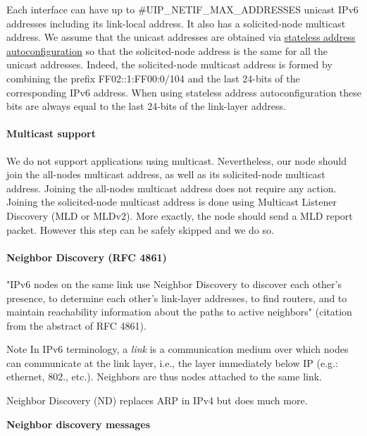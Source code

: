 \-Each interface can have up to \#\-U\-I\-P\-\_\-\-N\-E\-T\-I\-F\-\_\-\-M\-A\-X\-\_\-\-A\-D\-D\-R\-E\-S\-S\-E\-S unicast \-I\-Pv6 addresses including its link-\/local address. \-It also has a solicited-\/node multicast address. \-We assume that the unicast addresses are obtained via \hyperlink{a00061_autoconf}{stateless address autoconfiguration} so that the solicited-\/node address is the same for all the unicast addresses. \-Indeed, the solicited-\/node multicast address is formed by combining the prefix \-F\-F02\-:\-:1\-:\-F\-F00\-:0/104 and the last 24-\/bits of the corresponding \-I\-Pv6 address. \-When using stateless address autoconfiguration these bits are always equal to the last 24-\/bits of the link-\/layer address.\hypertarget{a00061_multicast}{}\paragraph{\-Multicast support}\label{a00061_multicast}
\-We do not support applications using multicast. \-Nevertheless, our node should join the all-\/nodes multicast address, as well as its solicited-\/node multicast address. \-Joining the all-\/nodes multicast address does not require any action. \-Joining the solicited-\/node multicast address is done using \-Multicast \-Listener \-Discovery (\-M\-L\-D or \-M\-L\-Dv2). \-More exactly, the node should send a \-M\-L\-D report packet. \-However this step can be safely skipped and we do so.\hypertarget{a00061_nd}{}\paragraph{\-Neighbor Discovery (\-R\-F\-C 4861)}\label{a00061_nd}
"\-I\-Pv6 nodes on the same link use \-Neighbor \-Discovery to discover each other's presence, to determine each other's link-\/layer addresses, to find routers, and to maintain reachability information about the paths to active neighbors" (citation from the abstract of \-R\-F\-C 4861).

\begin{DoxyNote}{\-Note}
\-In \-I\-Pv6 terminology, a {\itshape link\/} is a communication medium over which nodes can communicate at the link layer, i.\-e., the layer immediately below \-I\-P (e.\-g.\-: ethernet, 802., etc.). \-Neighbors are thus nodes attached to the same link.
\end{DoxyNote}
\-Neighbor \-Discovery (\-N\-D) replaces \-A\-R\-P in \-I\-Pv4 but does much more.

{\bfseries \-Neighbor discovery messages }\par


